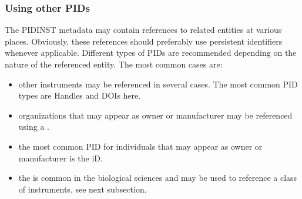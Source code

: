 \documentclass[a4paper,10pt,english]{sphinxmanual}
\begin{document}
\subsubsection{Using other PIDs}
\label{\detokenize{white-paper/metadata-schema-recommendations:using-other-pids}}
\sphinxAtStartPar
The PIDINST metadata may contain references to related entities at
various places.  Obviously, these references should preferably use
persistent identifiers whenever applicable.  Different types of PIDs
are recommended depending on the nature of the referenced entity.  The
most common cases are:
\begin{itemize}
\item {} 
\sphinxAtStartPar
other instruments may be referenced in several cases.  The most
common PID types are Handles and DOIs here.

\item {} 
\sphinxAtStartPar
organizations that may appear as owner or manufacturer may be
referenced using a .

\item {} 
\sphinxAtStartPar
the most common PID for individuals that may appear as owner or
manufacturer is the  iD.

\item {} 
\sphinxAtStartPar
the  is common in the biological sciences and may be used to
reference a class of instruments, see next subsection.

\end{itemize}
\end{document}
